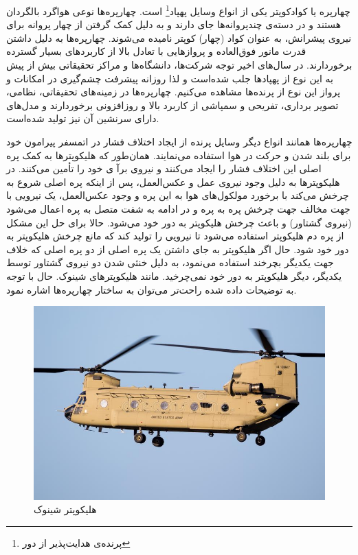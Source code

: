 


چهارپره یا کوادکوپتر یکی از انواع وسایل پهپاد\footnote{پرنده‌ی هدایت‌پذیر از دور} است. چهارپره‌ها نوعی هواگرد بالگردان هستند و در دسته‌ی چندپروانه‌ها جای دارند و به دلیل کمک گرفتن از چهار پروانه برای نیروی پیشرانش، به عنوان کواد (چهار) کوپتر نامیده می‌شوند. چهارپره‌ها به دلیل داشتن قدرت مانور فوق‌العاده و پروازهایی با تعادل بالا از کاربردهای بسیار گسترده برخوردارند.
در سال‌های اخیر توجه شرکت‌ها، دانشگاه‌ها و مراکز تحقیقاتی بیش از پیش به این نوع از پهپادها جلب شده‌است و لذا روزانه پیشرفت چشم‌گیری در امکانات و پرواز این نوع از پرنده‌ها مشاهده می‌کنیم. چهارپره‌ها در زمینه‌های تحقیقاتی، نظامی، تصویر برداری، تفریحی و سمپاشی از کاربرد بالا و روزافزونی برخوردارند و مدل‌های دارای سرنشین آن نیز تولید شده‌است.




چهارپره‌ها همانند انواع دیگر وسایل پرنده از ایجاد اختلاف فشار در اتمسفر پیرامون خود برای بلند شدن و حرکت در هوا استفاده می‌نمایند. همان‌طور که هلیکوپتر‌ها به کمک پره اصلی این اختلاف فشار را ایجاد می‌کنند و نیروی برآ ی خود را تأمین می‌کنند. در هلیکوپترها به دلیل وجود نیروی عمل و عکس‌العمل، پس از اینکه پره اصلی شروع به چرخش می‌کند با برخورد مولکول‌های هوا به این پره و وجود عکس‌العمل، یک نیرویی با جهت مخالف جهت چرخش پره به پره و در ادامه به شفت متصل به پره اعمال می‌شود (نیروی گشتاور) و باعث چرخش هلیکوپتر به دور خود می‌شود. حالا برای حل این مشکل از پره دم هلیکوپتر استفاده می‌شود تا نیرویی را تولید کند که مانع چرخش هلیکوپتر به دور خود شود. حال اگر هلیکوپتر به جای داشتن یک پره اصلی از دو پره اصلی که خلاف جهت یکدیگر بچرخند استفاده می‌نمود، به دلیل خنثی شدن دو نیروی گشتاور توسط یکدیگر، دیگر هلیکوپتر به دور خود نمی‌چرخید. مانند هلیکوپترهای شینوک. حال با توجه به توضیحات داده شده راحت‌تر می‌توان به ساختار چهارپره‌ها اشاره نمود.
\begin{figure}[H]
	\includegraphics[width=12cm]{figs/introduction/boeing-ch-chinook.jpg}
	\centering
	\caption{هلیکوپتر شینوک\cite{CH-47}}
\end{figure}


